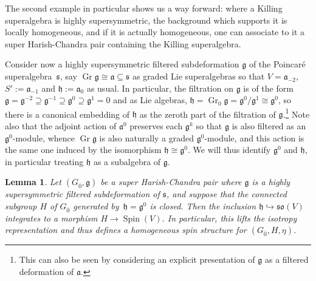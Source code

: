 \documentclass[10pt,a4paper]{amsart}
\numberwithin{equation}{section}
\newtheorem{Lemma}[Theorem]{Lemma}
\newcommand{\fa}{\mathfrak{a}}
\newcommand{\fg}{\mathfrak{g}}
\newcommand{\fh}{\mathfrak{h}}
\newcommand{\fs}{\mathfrak{s}}
\newcommand{\fso}{\mathfrak{so}}
\newcommand{\1}{\mathbbm{1}}
\DeclareMathOperator{\Spin}{Spin}
\DeclareMathOperator{\Gr}{Gr}
\begin{document}
The second example in particular shows us a way forward: where a Killing superalgebra is highly supersymmetric, the background which supports it is locally homogeneous, and if it is actually homogeneous, one can associate to it a super Harish-Chandra pair containing the Killing superalgebra.

Consider now a highly supersymmetric filtered subdeformation $\fg$ of the Poincar\'e superalgebra~$\fs$, say $\Gr\fg\cong\fa\subseteq\fs$ as graded Lie superalgebras so that $V=\fa_{-2}$, $S':=\fa_{-1}$ and $\fh:=\fa_0$ as usual. In particular, the filtration on $\fg$ is of the form $\fg=\fg^{-2}\supseteq\fg^{-1}\supseteq\fg^0\supseteq\fg^1=0$ and as Lie algebras, $\fh=\Gr_0\fg=\fg^0/\fg^1\cong\fg^0$, so there is a canonical embedding of $\fh$ as the zeroth part of the filtration of $\fg$.\footnote{This can also be seen by considering an explicit presentation of $\fg$ as a filtered deformation of $\fa$.}
Note also that the adjoint action of $\fa^0$ preserves each $\fg^k$ so that $\fg$ is also filtered as an $\fg^0$-module, whence $\Gr\fg$ is also naturally a graded $\fg^0$-module, and this action is the same one induced by the isomorphism $\fh\cong\fg^0$. We will thus identify $\fg^0$ and $\fh$, in particular treating $\fh$ as a subalgebra of $\fg$.

\begin{Lemma}\label{lemma:spin-lift-Ad}
	Let $(G_{\overline0},\fg)$ be a super Harish-Chandra pair where $\fg$ is a highly supersymmetric filtered subdeformation of $\fs$, and suppose that the connected subgroup $H$ of $G_{\overline0}$ generated by~${\fh=\fg^0}$ is closed. Then the inclusion $\fh\hookrightarrow\fso(V)$ integrates to a morphism $H\to\Spin(V)$. In particular, this lifts the isotropy representation and thus defines a homogeneous spin structure for $(G_{\overline0},H,\eta)$.
\end{Lemma}
\end{document}
